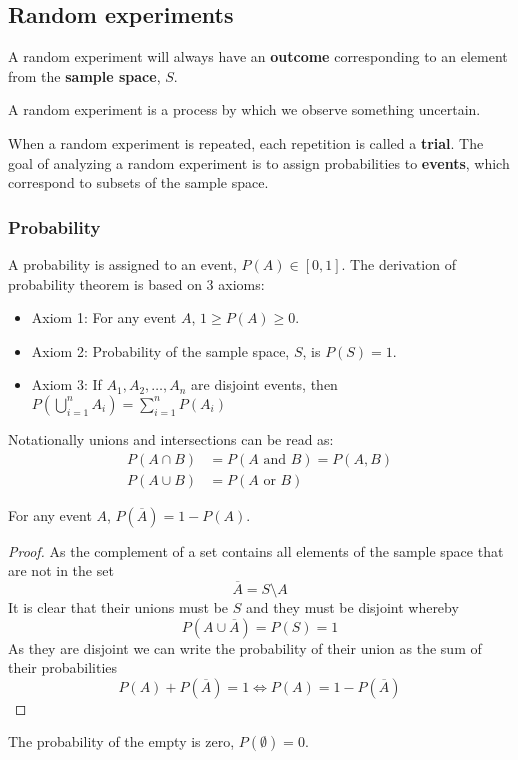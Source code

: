 \subsection{Random experiments}
A random experiment will always have an \textbf{outcome} corresponding to an element from the \textbf{sample space}, $S$.
\begin{definition}
  A random experiment is a process by which we observe something uncertain.
\end{definition}
When a random experiment is repeated, each repetition is called a \textbf{trial}. The goal of analyzing a random experiment is to assign probabilities to \textbf{events}, which correspond to subsets of the sample space.

\subsubsection{Probability}
A probability is assigned to an event, $P(A)\in[0,1]$. The derivation of probability theorem is based on 3 axioms:
\begin{itemize}
    \item Axiom 1: For any event $A$, $1\geq P(A)\geq 0$.
    \item Axiom 2: Probability of the sample space, $S$, is $P(S)=1$.
    \item Axiom 3: If $A_{1},A_{2},\ldots,A_{n}$ are disjoint events, then $P(\bigcup_{i=1}^{n}A_{i})=\sum_{i=1}^{n}P(A_{i})$
\end{itemize}
Notationally unions and intersections can be read as:
\begin{align*}
    P(A\cap B)&=P(A \text{ and } B)=P(A,B) \\
    P(A\cup B)&=P(A \text{ or } B)
\end{align*}
\begin{theorem}
  For any event $A$, $P(\overline{A})=1-P(A)$.
\end{theorem}
\begin{proof}
  As the complement of a set contains all elements of the sample space that are not in the set
  \[
      \overline{A}=S\setminus A
  \]
  It is clear that their unions must be $S$ and they must be disjoint whereby
  \[
      P(A\cup \overline{A})=P(S)=1
  \]
  As they are disjoint we can write the probability of their union as the sum of their probabilities
  \[
      P(A)+P(\overline{A})=1\Leftrightarrow P(A)=1-P(\overline{A})
  \]
\end{proof}
\begin{theorem}
  The probability of the empty is zero, $P(\emptyset)=0$.
\end{theorem}
